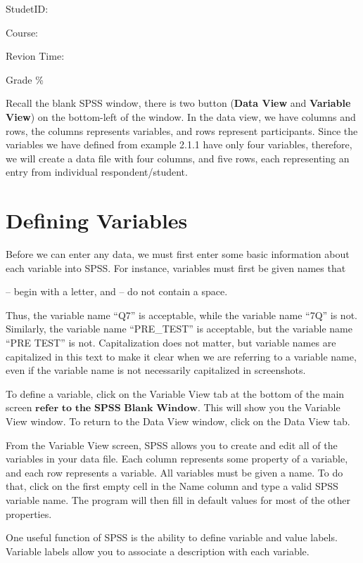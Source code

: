 \documentclass[
]{book}
\begin{document}
StudetID:

Course:

Revion Time:

Grade \%

Recall the blank SPSS window, there is two button (\textbf{Data View} and \textbf{Variable View}) on the bottom-left of the window. In the data view, we have columns and rows, the columns represents variables, and rows represent participants. Since the variables we have defined from example 2.1.1 have only four variables, therefore, we will create a data file with four columns, and five rows, each representing an entry from individual respondent/student.

\hypertarget{defining-variables}{%
\section{Defining Variables}\label{defining-variables}}

Before we can enter any data, we must first enter some basic information about each variable into SPSS. For instance, variables must first be given names that

-- begin with a letter, and
-- do not contain a space.

Thus, the variable name ``Q7'' is acceptable, while the variable name ``7Q'' is not. Similarly, the variable name ``PRE\_TEST'' is acceptable, but the variable name ``PRE TEST'' is not. Capitalization does not matter, but variable names are capitalized in this text to make it clear when we are referring to a variable name, even if the variable name is not necessarily capitalized in screenshots.

To define a variable, click on the Variable View tab at the bottom of the main screen \(\textbf{refer to the SPSS Blank Window}\). This will show you the Variable View window. To return to the Data View window, click on the Data View tab.

From the Variable View screen, SPSS allows you to create and edit all of the variables in your data file. Each column represents some property of a variable, and each row represents a variable. All variables must be given a name. To do that, click on the first empty cell in the Name column and type a valid SPSS variable name. The program will then fill in default values for most of the other properties.

One useful function of SPSS is the ability to define variable and value labels. Variable labels allow you to associate a description with each variable.
\end{document}
